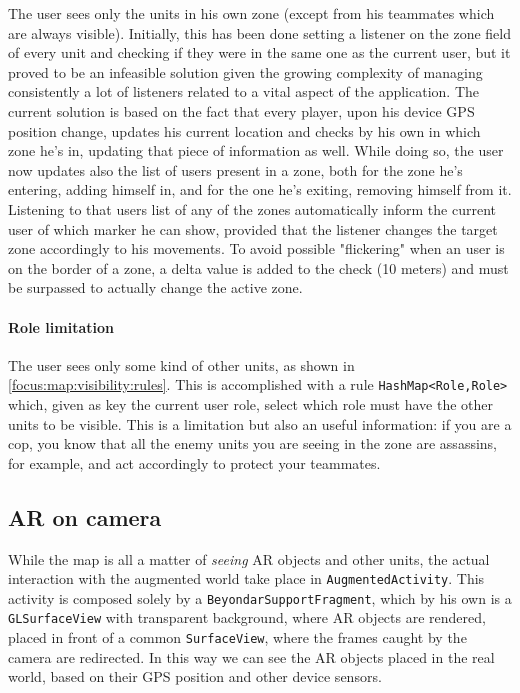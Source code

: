 				The user sees only the units in his own zone (except from his teammates which are always visible). Initially, this has been done setting a listener on the zone field of every unit and checking if they were in the same one as the current user, but it proved to be an infeasible solution given the growing complexity of managing consistently a lot of listeners related to a vital aspect of the application.
				The current solution is based on the fact that every player, upon his device GPS position change, updates his current location and checks by his own in which zone he's in, updating that piece of information as well.
				While doing so, the user now updates also the list of users present in a zone, both for the zone he's entering, adding himself in, and for the one he's exiting, removing himself from it.
				Listening to that users list of any of the zones automatically inform the current user of which marker he can show, provided that the listener changes the target zone accordingly to his movements.
				To avoid possible "flickering" when an user is on the border of a zone, a delta value is added to the check (10 meters) and must be surpassed to actually change the active zone.
				
				\paragraph{Role limitation}
				
				The user sees only some kind of other units, as shown in \autoref{focus:map:visibility:rules}.
				This is accomplished with a rule \lstinline|HashMap<Role,Role>| which, given as key the current user role, select which role must have the other units to be visible.
				This is a limitation but also an useful information: if you are a cop, you know that all the enemy units you are seeing in the zone are assassins, for example, and act accordingly to protect your teammates.
				
		\subsection{AR on camera}\label{focus:augmented}
			
		While the map is all a matter of \emph{seeing} AR objects and other units, the actual interaction with the augmented world take place in \lstinline|AugmentedActivity|.
		This activity is composed solely by a \lstinline|BeyondarSupportFragment|, which by his own is a \lstinline|GLSurfaceView| with transparent background, where AR objects are rendered, placed in front of a common \lstinline|SurfaceView|, where the frames caught by the camera are redirected. In this way we can see the AR objects placed in the real world, based on their GPS position and other device sensors.
		

